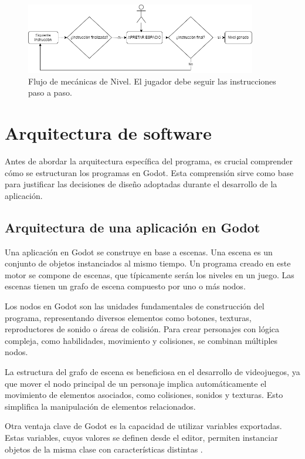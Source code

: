 \begin{figure}[h]
	\centering
	\includegraphics[width=0.9\textwidth]{imagenes/FlujoDeMecanicasDeNivel.drawio.png}
	\caption{Flujo de mecánicas de Nivel. El jugador debe seguir las instrucciones paso a paso.}
	\label{FlujoMecanicaDeNivel}
\end{figure}



\section{Arquitectura de software}

Antes de abordar la arquitectura específica del programa, es crucial comprender cómo se estructuran los programas en Godot. Esta comprensión sirve como base para justificar las decisiones de diseño adoptadas durante el desarrollo de la aplicación.

\subsection{Arquitectura de una aplicación en Godot}

Una aplicación en Godot se construye en base a escenas. Una escena es un conjunto de objetos instanciados al mismo tiempo. Un programa creado en este motor se compone de escenas, que típicamente serán los niveles en un juego. Las escenas tienen un grafo de escena compuesto por uno o más nodos.

Los nodos en Godot son las unidades fundamentales de construcción del programa, representando diversos elementos como botones, texturas, reproductores de sonido o áreas de colisión. Para crear personajes con lógica compleja, como habilidades, movimiento y colisiones, se combinan múltiples nodos.

La estructura del grafo de escena es beneficiosa en el desarrollo de videojuegos, ya que mover el nodo principal de un personaje implica automáticamente el movimiento de elementos asociados, como colisiones, sonidos y texturas. Esto simplifica la manipulación de elementos relacionados.

Otra ventaja clave de Godot es la capacidad de utilizar variables exportadas. Estas variables, cuyos valores se definen desde el editor, permiten instanciar objetos de la misma clase con características distintas \cite{GodotExportVariables}.


